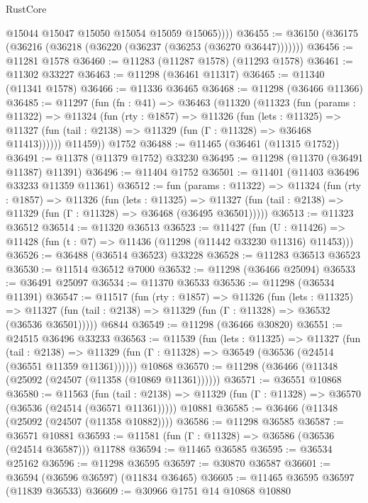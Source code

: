 \begin{lexlean}{RustCore}
\begin{coremodule}
            @15044
            @15047
            @15050
            @15054
            @15059
            @15065))))
@36455 := @36150 (@36175 (@36216 (@36218 (@36220 (@36237 (@36253 (@36270 @36447)))))))
@36456 := @11281 @1578
@36460 := @11283 (@11287 @1578) (@11293 @1578)
@36461 := @11302 @33227
@36463 := @11298 (@36461 @11317)
@36465 := @11340 (@11341 @1578)
@36466 := @11336 @36465
@36468 := @11298 (@36466 @11366)
@36485 := @11297
    (fun (fn : @41) =>
    @36463
      (@11320
        (@11323
          (fun (params : @11322) =>
          @11324
            (fun (rty : @1857) =>
            @11326
              (fun (lets : @11325) =>
              @11327 (fun (tail : @2138) => @11329 (fun (Γ : @11328) => @36468 @11413))))))
        @11459))
    @1752
@36488 := @11465 (@36461 (@11315 @1752))
@36491 := @11378 (@11379 @1752) @33230
@36495 := @11298 (@11370 (@36491 @11387) @11391)
@36496 := @11404 @1752
@36501 := @11401 (@11403 @36496 @33233 @11359 @11361)
@36512 := fun (params : @11322) =>
  @11324
    (fun (rty : @1857) =>
    @11326
      (fun (lets : @11325) =>
      @11327 (fun (tail : @2138) => @11329 (fun (Γ : @11328) => @36468 (@36495 @36501)))))
@36513 := @11323 @36512
@36514 := @11320 @36513
@36523 := @11427
    (fun (U : @11426) => @11428 (fun (t : @7) => @11436 (@11298 (@11442 @33230 @11316) @11453)))
@36526 := @36488 (@36514 @36523) @33228
@36528 := @11283 @36513 @36523
@36530 := @11514 @36512 @7000
@36532 := @11298 (@36466 @25094)
@36533 := @36491 @25097
@36534 := @11370 @36533
@36536 := @11298 (@36534 @11391)
@36547 := @11517
    (fun (rty : @1857) =>
    @11326
      (fun (lets : @11325) =>
      @11327 (fun (tail : @2138) => @11329 (fun (Γ : @11328) => @36532 (@36536 @36501)))))
    @6844
@36549 := @11298 (@36466 @30820)
@36551 := @24515 @36496 @33233
@36563 := @11539
    (fun (lets : @11325) =>
    @11327
      (fun (tail : @2138) =>
      @11329 (fun (Γ : @11328) => @36549 (@36536 (@24514 (@36551 @11359 @11361))))))
    @10868
@36570 := @11298 (@36466 (@11348 (@25092 (@24507 (@11358 (@10869 @11361))))))
@36571 := @36551 @10868
@36580 := @11563
    (fun (tail : @2138) => @11329 (fun (Γ : @11328) => @36570 (@36536 (@24514 (@36571 @11361)))))
    @10881
@36585 := @36466 (@11348 (@25092 (@24507 (@11358 @10882))))
@36586 := @11298 @36585
@36587 := @36571 @10881
@36593 := @11581 (fun (Γ : @11328) => @36586 (@36536 (@24514 @36587))) @11788
@36594 := @11465 @36585
@36595 := @36534 @25162
@36596 := @11298 @36595
@36597 := @30870 @36587
@36601 := @36594 (@36596 @36597) (@11834 @36465)
@36605 := @11465 @36595 @36597 (@11839 @36533)
@36609 := @30966 @1751 @14 @10868 @10880

\end{coremodule}
\end{lexlean}

